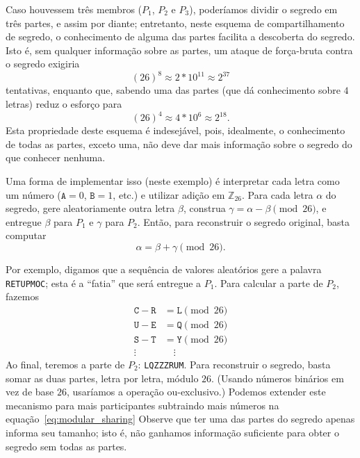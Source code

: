 \documentclass[10pt,twocolumn]{article}
\begin{document}
Caso houvessem três membros
($P_1$, $P_2$ e $P_3$),
poderíamos dividir o segredo em três partes,
e assim por diante;
entretanto,
neste esquema de compartilhamento de segredo,
o conhecimento de alguma das partes
facilita a descoberta do segredo.
Isto é,
sem qualquer informação sobre as partes,
um ataque de força-bruta contra o segredo
exigiria
\begin{equation*}
    (26)^8 \approx 2*10^{11} \approx 2^{37}
\end{equation*}
tentativas,
enquanto que, sabendo uma das partes
(que dá conhecimento sobre $4$ letras)
reduz o esforço para
\begin{equation*}
    (26)^4 \approx 4*10^{6} \approx 2^{18}.
\end{equation*}
Esta propriedade deste esquema é indesejável,
pois, idealmente,
o conhecimento de todas as partes, exceto uma,
não deve dar mais informação sobre o segredo
do que conhecer nenhuma.

Uma forma de implementar isso
(neste exemplo)
é interpretar cada letra como um número
($\mathtt A = 0$, $\mathtt B = 1$, etc.)
e utilizar adição em $\mathbb Z_{26}$.
Para cada letra $\alpha$ do segredo,
gere aleatoriamente outra letra $\beta$,
construa $\gamma = \alpha - \beta \pmod{26}$,
e entregue $\beta$ para $P_1$ e $\gamma$ para $P_2$.
Então,
para reconstruir o segredo original,
basta computar
\begin{equation*}
    \alpha = \beta + \gamma \pmod{26}.
    \label{eq:modular_sharing}
\end{equation*}

Por exemplo,
digamos que a sequência de valores aleatórios gere a palavra
\texttt{RETUPMOC};
esta é a ``fatia'' que será entregue a $P_1$.
Para calcular a parte de $P_2$,
fazemos
\begin{align*}
    \mathtt C - \mathtt R &= \mathtt L \pmod{26} \\
    \mathtt U - \mathtt E &= \mathtt Q \pmod{26} \\
    \mathtt S - \mathtt T &= \mathtt Y \pmod{26} \\
    \vdots \quad & \quad \vdots
\end{align*}
Ao final,
teremos a parte de $P_2$: \texttt{LQZZZRUM}.
Para reconstruir o segredo,
basta somar as duas partes,
letra por letra,
módulo $26$.
(Usando números binários em vez de base $26$,
usaríamos a operação ou-exclusivo.)
Podemos extender este mecanismo para mais participantes
subtraindo mais números na equação~\ref{eq:modular_sharing}
Observe que ter uma das partes do segredo
apenas informa seu tamanho;
isto é,
não ganhamos informação suficiente para obter o segredo
sem todas as partes.
\end{document}
